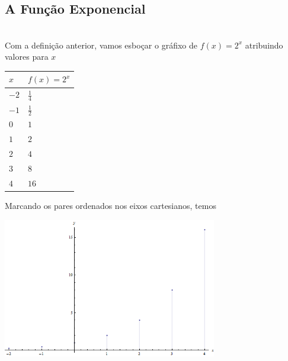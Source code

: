 \subsection{A Função Exponencial}
\label{def:funcexp}\\
Com a definição anterior, vamos esboçar o gráfixo de $f(x)=2^x$ atribuindo valores para $x$
\begin{center}
\label{tab:exeresol2ax}
\begin{tabular}{| l | l |}
  \hline
  $x$ & $f(x)=2^x$ \\
  \hline
  $-2$ & $\frac{1}{4}$ \\
  \hline
  $-1$ & $\frac{1}{2}$ \\
  \hline
  $0$ & $1$ \\
  \hline
  $1$ & $2$ \\
  \hline
  $2$ & $4$ \\
  \hline
  $3$ & $8$ \\
  \hline
  $4$ & $16$ \\
  \hline
\end{tabular}
\end{center}
Marcando os pares ordenados nos eixos cartesianos, temos \\
\begin{center}

\includegraphics[width=0.7\textwidth]{imagens/2ax.png}
	\label{fig:exeresol2ax}
\end{center}

